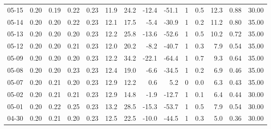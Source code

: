 \begin{threeparttable}
{\begin{tabular}{lrrrrrrrrrrrrr}
  05-15 &          0.20 &          0.19 &          0.22 &        0.23 &                11.9 &                24.2 &      -12.4 &        -51.1 &              1 &                 0.5 &             12.3 &            0.88 &                  30.00 \\
  05-14 &          0.20 &          0.20 &          0.22 &        0.23 &                12.1 &                17.5 &       -5.4 &        -30.9 &              1 &                 0.2 &             11.2 &            0.80 &                  35.00 \\
  05-13 &          0.20 &          0.20 &          0.20 &        0.23 &                12.2 &                25.8 &      -13.6 &        -52.6 &              1 &                 0.5 &             10.2 &            0.72 &                  35.00 \\
  05-12 &          0.20 &          0.20 &          0.21 &        0.23 &                12.0 &                20.2 &       -8.2 &        -40.7 &              1 &                 0.3 &              7.9 &            0.54 &                  35.00 \\
  05-09 &          0.20 &          0.20 &          0.20 &        0.23 &                12.2 &                34.2 &      -22.1 &        -64.4 &              1 &                 0.7 &              9.3 &            0.64 &                  35.00 \\
  05-08 &          0.20 &          0.20 &          0.23 &        0.23 &                12.4 &                19.0 &       -6.6 &        -34.5 &              1 &                 0.2 &              6.9 &            0.46 &                  35.00 \\
  05-07 &          0.20 &          0.21 &          0.20 &        0.23 &                12.9 &                12.2 &        0.6 &          5.2 &              0 &                 0.0 &              6.3 &            0.43 &                  35.00 \\
  05-02 &          0.20 &          0.21 &          0.21 &        0.23 &                12.9 &                14.8 &       -1.9 &        -12.7 &              1 &                 0.1 &              6.4 &            0.44 &                  30.00 \\
  05-01 &          0.20 &          0.22 &          0.25 &        0.23 &                13.2 &                28.5 &      -15.3 &        -53.7 &              1 &                 0.5 &              7.9 &            0.54 &                  30.00 \\
  04-30 &          0.20 &          0.21 &          0.20 &        0.23 &                12.5 &                22.5 &      -10.0 &        -44.5 &              1 &                 0.3 &              5.0 &            0.36 &                  30.00 \\

\end{tabular}}
\end{threeparttable}
